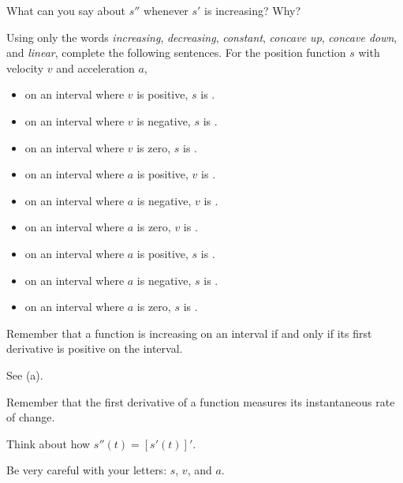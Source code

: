 \begin{activity}
	\item What can you say about $s''$ whenever $s'$ is increasing?  Why?
	\item Using only the words \emph{increasing}, \emph{decreasing}, \emph{constant}, \emph{concave up}, \emph{concave down}, and \emph{linear}, complete the following sentences.  For the position function $s$ with velocity $v$ and acceleration $a$,
	\begin{itemize}
		\item on an interval where $v$ is positive, $s$ is \underline{\hspace{1.5in}}.
		\item on an interval where $v$ is negative, $s$ is \underline{\hspace{1.5in}}. 
		\item on an interval where $v$ is zero, $s$ is \underline{\hspace{1.5in}}.

		\item on an interval where $a$ is positive, $v$ is \underline{\hspace{1.5in}}.
		\item on an interval where $a$ is negative, $v$ is \underline{\hspace{1.5in}}. 
		\item on an interval where $a$ is zero, $v$ is \underline{\hspace{1.5in}}.

		\item on an interval where $a$ is positive, $s$ is \underline{\hspace{1.5in}}.
		\item on an interval where $a$ is negative, $s$ is \underline{\hspace{1.5in}}. 
		\item on an interval where $a$ is zero, $s$ is \underline{\hspace{1.5in}}.
	\end{itemize}
\ea

\end{activity}
\begin{smallhint}
\ba
	\item Remember that a function is increasing on an interval if and only if its first derivative is positive on the interval.
	\item See (a).
	\item Remember that the first derivative of a function measures its instantaneous rate of change.
	\item Think about how $s''(t) = [s'(t)]'$.
	\item Be very careful with your letters:  $s$, $v$, and $a$. 
\ea
\end{smallhint}
